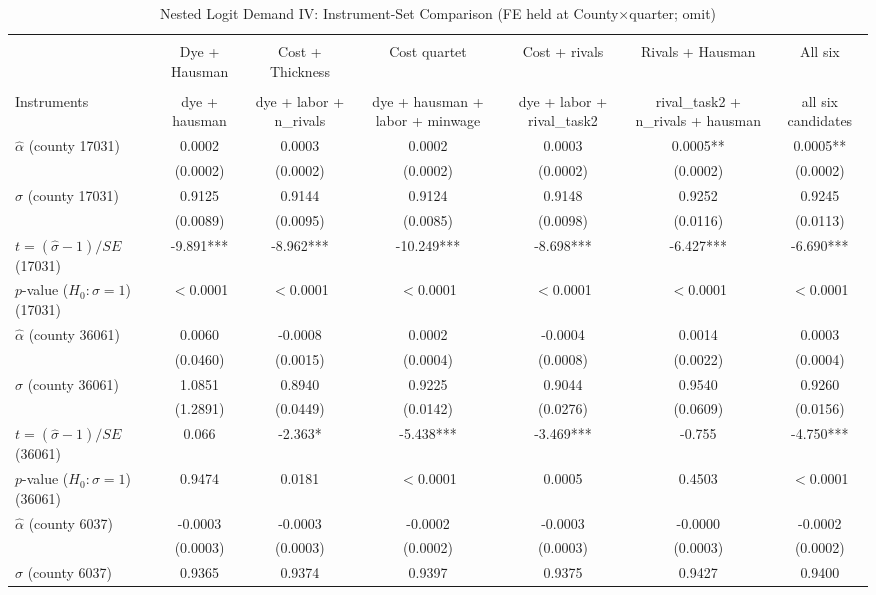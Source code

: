 \begin{table}[!htbp] \centering
  \caption{Nested Logit Demand IV: Instrument-Set Comparison (FE held at County$\times$quarter; omit)}
  \label{tab:nested_sigma_eq_one}
  \begin{tabular}{lcccccc}
\\[-1.8ex]\hline
\hline \\[-1.8ex]
 & Dye + Hausman & Cost + Thickness & Cost quartet & Cost + rivals & Rivals + Hausman & All six \\
\hline \\[-1.8ex]
Instruments & dye + hausman & dye + labor + n\_rivals & dye + hausman + labor + minwage & dye + labor + rival\_task2 & rival\_task2 + n\_rivals + hausman & all six candidates \\
$\hat\alpha$ (county 17031) & 0.0002 & 0.0003 & 0.0002 & 0.0003 & 0.0005** & 0.0005** \\
 & (0.0002) & (0.0002) & (0.0002) & (0.0002) & (0.0002) & (0.0002) \\
$\hat\sigma$ (county 17031) & 0.9125 & 0.9144 & 0.9124 & 0.9148 & 0.9252 & 0.9245 \\
 & (0.0089) & (0.0095) & (0.0085) & (0.0098) & (0.0116) & (0.0113) \\
$t=(\hat\sigma-1)/SE$ (17031) & -9.891*** & -8.962*** & -10.249*** & -8.698*** & -6.427*** & -6.690*** \\
$p$-value ($H_0: \sigma=1$) (17031) & $<$0.0001 & $<$0.0001 & $<$0.0001 & $<$0.0001 & $<$0.0001 & $<$0.0001 \\
$\hat\alpha$ (county 36061) & 0.0060 & -0.0008 & 0.0002 & -0.0004 & 0.0014 & 0.0003 \\
 & (0.0460) & (0.0015) & (0.0004) & (0.0008) & (0.0022) & (0.0004) \\
$\hat\sigma$ (county 36061) & 1.0851 & 0.8940 & 0.9225 & 0.9044 & 0.9540 & 0.9260 \\
 & (1.2891) & (0.0449) & (0.0142) & (0.0276) & (0.0609) & (0.0156) \\
$t=(\hat\sigma-1)/SE$ (36061) & 0.066 & -2.363* & -5.438*** & -3.469*** & -0.755 & -4.750*** \\
$p$-value ($H_0: \sigma=1$) (36061) & 0.9474 & 0.0181 & $<$0.0001 & 0.0005 & 0.4503 & $<$0.0001 \\
$\hat\alpha$ (county 6037) & -0.0003 & -0.0003 & -0.0002 & -0.0003 & -0.0000 & -0.0002 \\
 & (0.0003) & (0.0003) & (0.0002) & (0.0003) & (0.0003) & (0.0002) \\
$\hat\sigma$ (county 6037) & 0.9365 & 0.9374 & 0.9397 & 0.9375 & 0.9427 & 0.9400 \\

\end{tabular}
\end{table}
